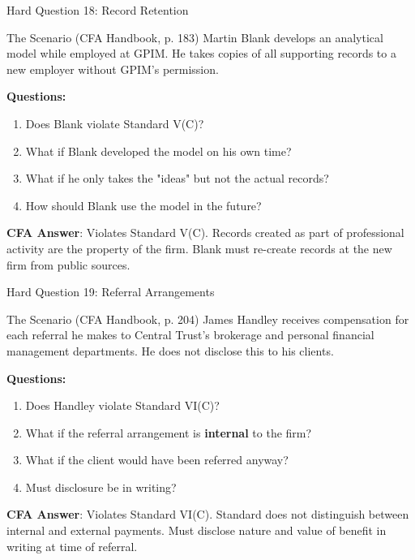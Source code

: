 \documentclass{beamer}
\begin{document}
	\begin{frame}{Hard Question 18: Record Retention}
		\begin{block}{The Scenario (CFA Handbook, p. 183)}
			Martin Blank develops an analytical model while employed at GPIM. He takes copies of all supporting records to a new employer without GPIM's permission.
		\end{block}
		
		\vspace{0.2cm}
		\textbf{Questions:}
		\begin{enumerate}
			\item Does Blank violate Standard V(C)?
			\item What if Blank developed the model on his own time?
			\item What if he only takes the "ideas" but not the actual records?
			\item How should Blank use the model in the future?
		\end{enumerate}
		
		\vspace{0.2cm}
		\textcolor{cfablue}{\textbf{CFA Answer}}: Violates Standard V(C). Records created as part of professional activity are the property of the firm. Blank must re-create records at the new firm from public sources.
	\end{frame}
	
	\begin{frame}{Hard Question 19: Referral Arrangements}
		\begin{block}{The Scenario (CFA Handbook, p. 204)}
			James Handley receives compensation for each referral he makes to Central Trust's brokerage and personal financial management departments. He does not disclose this to his clients.
		\end{block}
		
		\vspace{0.2cm}
		\textbf{Questions:}
		\begin{enumerate}
			\item Does Handley violate Standard VI(C)?
			\item What if the referral arrangement is \textbf{internal} to the firm?
			\item What if the client would have been referred anyway?
			\item Must disclosure be in writing?
		\end{enumerate}
		
		\vspace{0.2cm}
		\textcolor{cfablue}{\textbf{CFA Answer}}: Violates Standard VI(C). Standard does not distinguish between internal and external payments. Must disclose nature and value of benefit in writing at time of referral.
	\end{frame}
	
\end{document}
